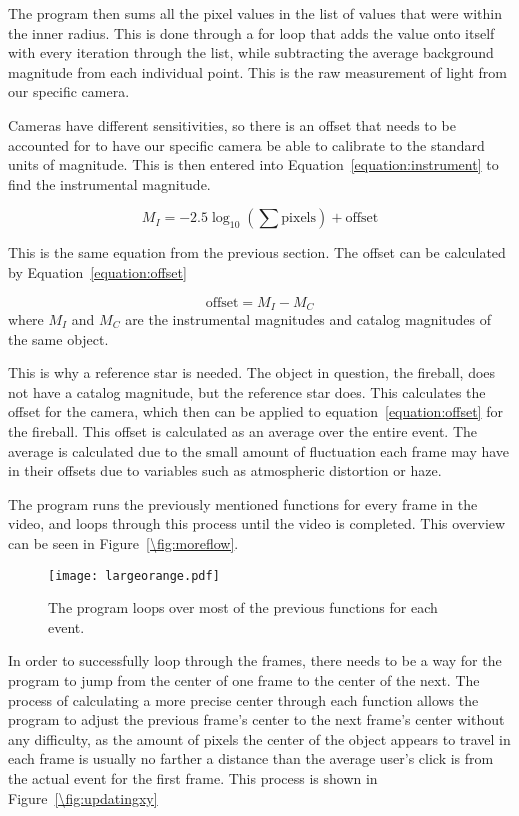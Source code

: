 The program then sums all the pixel values in the list of values that were within the inner radius. This is done through a for loop that adds the value onto itself with every iteration through the list, while subtracting the average background magnitude from each individual point. This is the raw measurement of light from our specific camera.

Cameras have different sensitivities, so there is an offset that needs to be accounted for to have our specific camera be able to calibrate to the standard units of magnitude.   This is then entered into Equation~\ref{equation:instrument} to find the instrumental magnitude. 

\begin{equation}
	M_I = -2.5 \log_{10}\left( \sum \text{pixels}\right) + \text{offset}
	\label{equation:instrument}
\end{equation}

This is the same equation from the previous section. The offset can be calculated by Equation~\ref{equation:offset}

\begin{equation}
	\text{offset} = M_I - M_C
	\label{equation:offset}
\end{equation}
where $M_I$ and $M_C$ are the instrumental magnitudes and catalog magnitudes of the same object.

This is why a reference star is needed. The object in question, the fireball, does not have a catalog magnitude, but the reference star does. This calculates the offset for the camera, which then can be applied to equation~\ref{equation:offset} for the fireball. This offset is calculated as an average over the entire event. The average is calculated due to the small amount of fluctuation each frame may have in their offsets due to variables such as atmospheric distortion or haze.

The program runs the previously mentioned functions for every frame in the video, and loops through this process until the video is completed. This overview can be seen in Figure~\ref{\fig:moreflow}.

\begin{figure}[ht!]
	\centering
	\texttt{[image: largeorange.pdf]}
	\caption{The program loops over most of the previous functions for each event.}
	\label{fig:moreflow}
\end{figure}

In order to successfully loop through the frames, there needs to be a way for the program to jump from the center of one frame to the center of the next. The process of calculating a more precise center through each function allows the program to adjust the previous frame's center to the next frame's center without any difficulty, as the amount of pixels the center of the object appears to travel in each frame is usually no farther a distance than the average user's click is from the actual event for the first frame. This process is shown in Figure~\ref{\fig:updatingxy}

